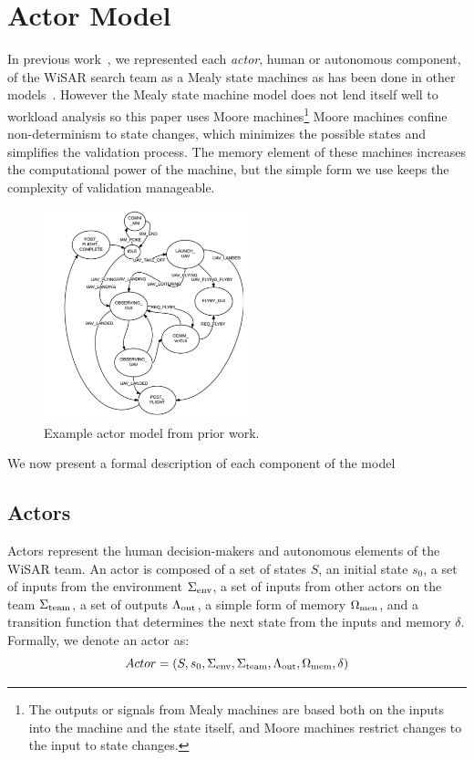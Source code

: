 \section{Actor Model} 

In previous work~\cite{gledhill2013modelinguas}, we represented each {\em actor}, human or autonomous component, of the WiSAR search team as a Mealy state machines as has been done in other models~\cite{bolton2013litreview}. However the Mealy state machine model does not lend itself well to workload analysis so this paper uses Moore machines\footnote{The outputs or signals from Mealy machines are based both on the inputs into the machine and the state itself,  and Moore machines restrict changes to the input to state changes.} Moore machines confine non-determinism to state changes, which minimizes the possible states and simplifies the validation process.  The memory element of these machines increases the computational power of the machine, but the simple form we use keeps the complexity of validation manageable.

\begin{figure}[h]
\center
\setlength{\abovecaptionskip}{1mm}
\setlength{\belowcaptionskip}{1mm}
\setlength{\textfloatsep}{1mm}
\setlength{\floatsep}{1mm}
\includegraphics[height=2.4in]{DiRG.png}
\caption{Example actor model from prior work.}
\label{fig:dirg}
\end{figure}

We now present a formal description of each component of the model
\subsection{Actors}
Actors represent the human decision-makers and autonomous elements of the WiSAR team.  An actor is composed of a set of states $S$, an initial state $s_0$, a set of inputs from the environment $\Sigma_{\rm env}$, a set of inputs from other actors on the team $\Sigma_{\rm team}$, a set of outputs $\Lambda_{\rm out}$, a simple form of memory $\Omega_{\rm men}$, and a transition function that determines the next state from the inputs and memory $\delta$. Formally, we denote an actor as:
\begin{equation}
 	Actor = (S, s_0, \Sigma_{\rm env}, \Sigma_{\rm team}, \Lambda_{\rm out}, \Omega_{\rm mem},\delta)
 \label{eq:actor}
 \end{equation}
 
